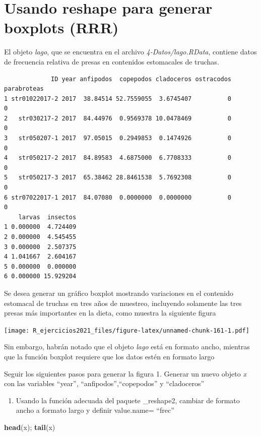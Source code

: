 \documentclass[]{book}
\newenvironment{Shaded}{\begin{snugshade}}{\end{snugshade}}
\newcommand{\KeywordTok}[1]{\textcolor[rgb]{0.13,0.29,0.53}{\textbf{#1}}}
\newcommand{\NormalTok}[1]{#1}
\providecommand{\tightlist}{%
  \setlength{\itemsep}{0pt}\setlength{\parskip}{0pt}}
\begin{document}
\hypertarget{usando-reshape-para-generar-boxplots-rrr}{%
\section{Usando reshape para generar boxplots (RRR)}\label{usando-reshape-para-generar-boxplots-rrr}}

El objeto \emph{lago}, que se encuentra en el archivo \emph{4-Datos/lago.RData}, contiene datos de frecuencia relativa de presas en contenidos estomacales de truchas.

\begin{verbatim}
             ID year anfipodos  copepodos cladoceros ostracodos parabroteas
1 str01022017-2 2017  38.84514 52.7559055  3.6745407          0           0
2   str030217-2 2017  84.44976  0.9569378 10.0478469          0           0
3   str050207-1 2017  97.05015  0.2949853  0.1474926          0           0
4   str050217-2 2017  84.89583  4.6875000  6.7708333          0           0
5   str050217-3 2017  65.38462 28.8461538  5.7692308          0           0
6 str07022017-1 2017  84.07080  0.0000000  0.0000000          0           0
    larvas  insectos
1 0.000000  4.724409
2 0.000000  4.545455
3 0.000000  2.507375
4 1.041667  2.604167
5 0.000000  0.000000
6 0.000000 15.929204
\end{verbatim}

Se desea generar un gráfico boxplot mostrando variaciones en el contenido estomacal de truchas en tres años de muestreo, incluyendo solamente las tres presas más importantes en la dieta, como muestra la siguiente figura

\texttt{[image: R\_ejercicios2021\_files/figure-latex/unnamed-chunk-161-1.pdf]}

Sin embargo, habrán notado que el objeto \emph{lago} está en formato ancho, mientras que la función boxplot requiere que los datos estén en formato largo

Seguir los siguientes pasos para generar la figura
1. Generar un nuevo objeto \emph{x} con las variables ``year'', ``anfipodos'',``copepodos'' y ``cladoceros''

\begin{enumerate}
\def\labelenumi{\arabic{enumi}.}
\setcounter{enumi}{1}
\tightlist
\item
  Usando la función adecuada del paquete \_reshape2, cambiar de formato ancho a formato largo y definir value.name= ``frec''
\end{enumerate}

\begin{Shaded}
\begin{Highlighting}[]
\KeywordTok{head}\NormalTok{(x); }\KeywordTok{tail}\NormalTok{(x)}
\end{Highlighting}
\end{Shaded}
\end{document}

